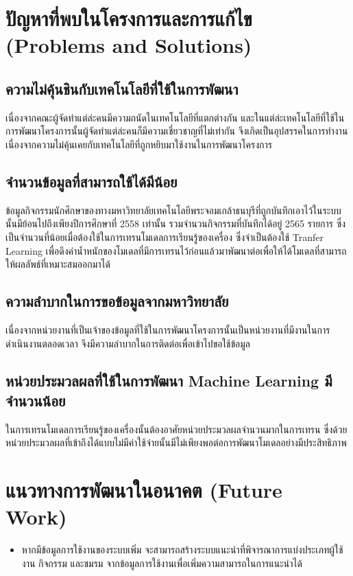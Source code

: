 \documentclass[14pt,oneside,openright,a4paper]{cpe-thai-project}
\begin{document}
\section{ปัญหาที่พบในโครงการและการแก้ไข (Problems and Solutions)}
\subsection{ความไม่คุ้นชินกับเทคโนโลยีที่ใช้ในการพัฒนา}
เนื่องจากคณะผู้จัดทำแต่ล่ะคนมีความถนัดในเทคโนโลยีที่แตกต่างกัน และในแต่ล่ะเทคโนโลยีที่ใช้ในการพัฒนาโครงการนั้นผู้จัดทำแต่ล่ะคนก็มีความเชี่ยวชาญที่ไม่เท่ากัน 
จึงเกิดเป็นอุปสรรคในการทำงานเนื่องจากความไม่คุ้นเคยกับเทคโนโลยีที่ถูกหยิบมาใช้งานในการพัฒนาโครงการ
\subsection{จำนวนข้อมูลที่สามารถใช้ได้มีน้อย}
ข้อมูลกิจกรรมนักศึกษาของทางมหาวิทยาลัยเทคโนโลยีพระจอมเกล้าธนบุรีที่ถูกบันทึกเอาไว้ในระบบนั้นมีย้อนไปถึงเพียงปีการศึกษาที่ 2558 เท่านั้น 
รวมจำนวนกิจกรรมที่บันทึกได้อยู่ 2565 รายการ ซึ่งเป็นจำนวนที่น้อยเมื่อต้องใช้ในการเทรนโมเดลการเรียนรู้ของเครื่อง ซึ่งจำเป็นต้องใช้ Tranfer Learning 
เพื่อดึงค่าน้ำหนักของโมเดลที่มีการเทรนไว้ก่อนแล้วมาพัฒนาต่อเพื่อให้ได้โมเดลที่สามารถให้ผลลัพธ์ที่เหมาะสมออกมาได้
\subsection{ความลำบากในการขอข้อมูลจากมหาวิทยาลัย}
เนื่องจากหน่วยงานที่เป็นเจ้าของข้อมูลที่ใช้ในการพัฒนาโครงการนั้นเป็นหน่วยงานที่มีงานในการดำเนินงานตลอดเวลา จึงมีความลำบากในการติดต่อเพื่อเข้าไปขอใช้ข้อมูล
\subsection{หน่วยประมวลผลที่ใช้ในการพัฒนา Machine Learning มีจำนวนน้อย}
ในการเทรนโมเดลการเรียนรู้ของเครื่องนั้นต้องอาศัยหน่วยประมวลผลจำนวนมากในการเทรน ซึ่งด้วยหน่วยประมวลผลที่เข้าถึงได้แบบไม่มีค่าใช้จ่ายนั้นมีไม่เพียงพอต่อการพัฒนาโมเดลอย่างมีประสิทธิภาพ
\section{แนวทางการพัฒนาในอนาคต (Future Work)}
\begin{itemize}
  \item หากมีข้อมูลการใช้งานของระบบเพิ่ม จะสามารถสร้างระบบแนะนำที่พิจารณาการแบ่งประเภทผู้ใช้งาน กิจกรรม และชมรม จากข้อมูลการใช้งานเพื่อเพิ่มความสามารถในการแนะนำได้
\end{itemize}
\makeatletter
\g@addto@macro{\UrlBreaks}{\UrlOrds}
\makeatother



\end{document}
